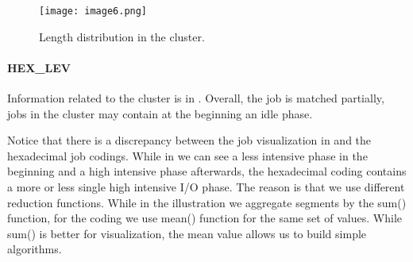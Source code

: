 \documentclass{jhps}
\begin{document}
\begin{minipage}{\textwidth}
\medskip

\begingroup
  \begin{subfigure}{\textwidth}
  \centering
  \texttt{[image: image6.png]}
  \caption{Length distribution in the cluster.}
  \label{fig:use_case:bin_aggzeros:length}
  \end{subfigure}
\endgroup

\label{fig:use_case:bin_aggzeros}
\end{minipage}


\paragraph{HEX\_LEV}
Information related to the cluster is in .
Overall, the job is matched partially, jobs in the cluster may contain at the beginning an idle phase.

Notice that there is a discrepancy between the job visualization in  and the hexadecimal job codings.
While in  we can see a less intensive phase in the beginning and a high intensive phase afterwards, the hexadecimal coding contains a more or less single high intensive I/O phase.
The reason is that we use different reduction functions.
While in the illustration we aggregate segments by the sum() function, for the coding we use mean() function for the same set of values.
While sum() is better for visualization, the mean value allows us to build simple algorithms.
\end{document}
